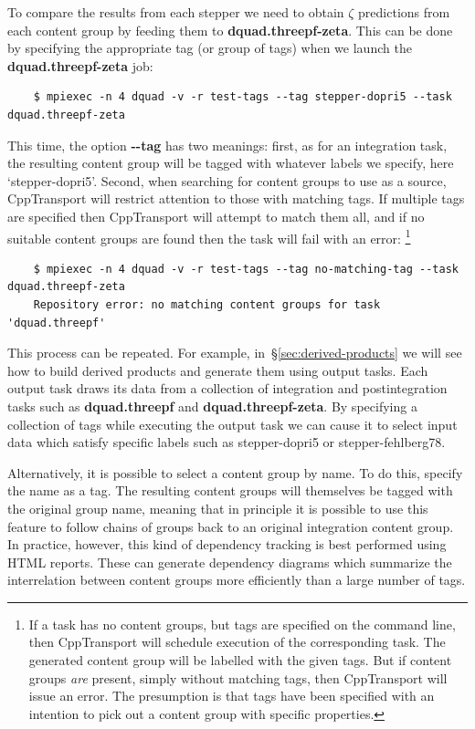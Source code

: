 \documentclass[11pt,a4paper]{article}
\newcommand{\repoobject}[1]{{\ttfamily\bfseries\small #1}}
\newcommand{\packagefont}{\sffamily}
\newcommand{\CppTransport}{{\packagefont CppTransport}}
\newcommand{\option}[1]{{\ttfamily\bfseries\small #1}}
\newcommand{\semibold}[1]{{\fontseries{b}\selectfont{#1}}}
\newcommand{\para}[1]{\par\vspace{2mm}\noindent\semibold{{#1.}---}\ignorespaces}
\newcommand{\grouptag}[1]{\textsf{{#1}}}
\begin{document}
To compare the results from each stepper we need to obtain
$\zeta$ predictions from each content group
by feeding them to
\repoobject{dquad.threepf-zeta}.
This can be done by specifying the appropriate tag (or group of tags)
when we launch the \repoobject{dquad.threepf-zeta} job:
\begin{verbatim}
    $ mpiexec -n 4 dquad -v -r test-tags --tag stepper-dopri5 --task dquad.threepf-zeta    
\end{verbatim}
This time, the option
\option{{-}{-}tag} has two meanings:
first, as for an integration task,
the resulting content group will be
tagged with whatever labels we specify, here
`\grouptag{stepper-dopri5}'.
Second, when searching for content groups to use as a source,
{\CppTransport} will restrict attention to those with matching tags.
If multiple tags are specified then {\CppTransport} will attempt to match
them all,
and if no suitable content groups are found
then the task will fail with an error:%
    \footnote{If a task has no content groups, but tags are specified on the
    command line, then {\CppTransport} will schedule execution of the corresponding
    task. The generated content group will be labelled with the given tags.
    But if content groups \emph{are} present, simply without matching tags, then
    {\CppTransport} will issue an error.
    The presumption is that tags
    have been specified with an intention to pick out
    a content group with specific properties.}
\begin{verbatim}
    $ mpiexec -n 4 dquad -v -r test-tags --tag no-matching-tag --task dquad.threepf-zeta 
    Repository error: no matching content groups for task 'dquad.threepf'    
\end{verbatim}

This process can be repeated.
For example, in~\S\ref{sec:derived-products}
we will see how to build derived products and generate them using output tasks.
Each output task draws its data from a collection of integration and
postintegration tasks such as \repoobject{dquad.threepf}
and \repoobject{dquad.threepf-zeta}.
By specifying a collection of tags while executing the output task we can cause it
to select input data which satisfy specific labels
such as 
\grouptag{stepper-dopri5}
or
\grouptag{stepper-fehlberg78}.

\para{Selecting a content group by name}
Alternatively, it is possible to select a content group by name.
To do this,
specify the name as a tag.
The resulting content groups will
themselves be tagged with the original group name,
meaning that in principle it is possible to use this feature
to follow chains
of groups back to an original integration content group.
In practice, however, this kind of dependency tracking is best performed
using HTML reports. These can generate dependency diagrams which summarize the
interrelation between content groups more efficiently than a large number of tags.
\end{document}

